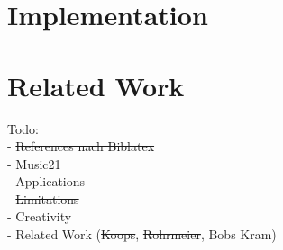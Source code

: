 \documentclass[a4paper,11pt, fleqn]{article}
\date{\today}
\author{Thats Me}
\begin{document}

\tableofcontents 

\clearpage


\clearpage
\section{Implementation}









\clearpage
\section{Related Work}



\clearpage


\clearpage
\noindent
Todo:\\
- \sout{References nach Biblatex}\\
- Music21\\
- Applications\\
- \sout{Limitations}\\
- Creativity\\
- Related Work (\sout{Koops}, \sout{Rohrmeier}, Bobs Kram)

%

\printbibliography
\end{document}
